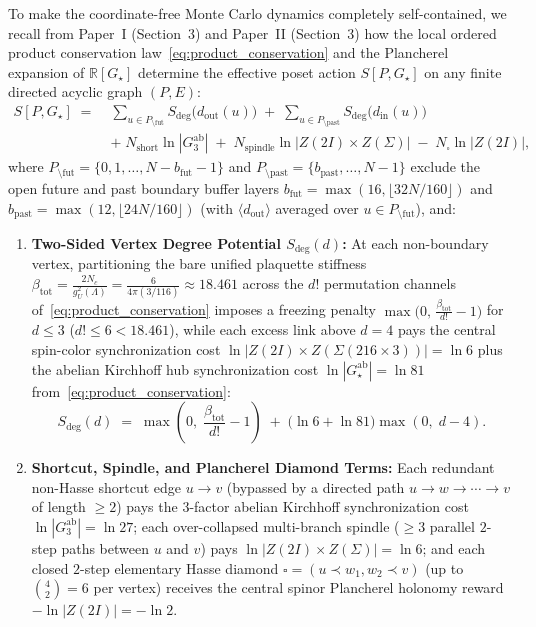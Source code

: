 \documentclass[11pt,a4paper]{article}
\theoremstyle{definition}
\theoremstyle{remark}
\newcommand{\R}{\mathbb{R}}
\newcommand{\Gthree}{G_3}
\newcommand{\Gstar}{G_\star}
\begin{document}
To make the coordinate-free Monte Carlo dynamics completely self-contained, we recall from Paper~I (Section~3) and Paper~II (Section~3) how the local ordered product conservation law~\eqref{eq:product_conservation} and the Plancherel expansion of $\R[\Gstar]$ determine the effective poset action $S[P, \Gstar]$ on any finite directed acyclic graph $(P, E)$:
\begin{equation}
\label{eq:poset_action_exp2}
\begin{aligned}
S[P, \Gstar] \;=\; &\sum_{u \in P_{\setminus\mathrm{fut}}} S_{\mathrm{deg}}\bigl(d_{\mathrm{out}}(u)\bigr) \;+\; \sum_{u \in P_{\setminus\mathrm{past}}} S_{\mathrm{deg}}\bigl(d_{\mathrm{in}}(u)\bigr) \\
&+\; N_{\mathrm{short}}\ln|\Gthree^{\mathrm{ab}}| \;+\; N_{\mathrm{spindle}}\ln|Z(2I)\times Z(\Sigma)| \;-\; N_\square \ln|Z(2I)|,
\end{aligned}
\end{equation}
where $P_{\setminus\mathrm{fut}} = \{0, 1, \dots, N - b_{\mathrm{fut}} - 1\}$ and $P_{\setminus\mathrm{past}} = \{b_{\mathrm{past}}, \dots, N - 1\}$ exclude the open future and past boundary buffer layers $b_{\mathrm{fut}} = \max(16, \lfloor 32N/160\rfloor)$ and $b_{\mathrm{past}} = \max(12, \lfloor 24N/160\rfloor)$ (with $\langle d_{\mathrm{out}}\rangle$ averaged over $u \in P_{\setminus\mathrm{fut}}$), and:
\begin{enumerate}
    \item \textbf{Two-Sided Vertex Degree Potential $S_{\mathrm{deg}}(d)$:} At each non-boundary vertex, partitioning the bare unified plaquette stiffness $\beta_{\mathrm{tot}} = \frac{2N_c}{g_U^2(\Lambda)} = \frac{6}{4\pi(3/116)} \approx 18.461$ across the $d!$ permutation channels of~\eqref{eq:product_conservation} imposes a freezing penalty $\max\bigl(0,\, \frac{\beta_{\mathrm{tot}}}{d!} - 1\bigr)$ for $d \le 3$ ($d! \le 6 < 18.461$), while each excess link above $d = 4$ pays the central spin-color synchronization cost $\ln|Z(2I)\times Z(\Sigma(216\times 3))| = \ln 6$ plus the abelian Kirchhoff hub synchronization cost $\ln|\Gstar^{\mathrm{ab}}| = \ln 81$ from~\eqref{eq:product_conservation}:
    \begin{equation}
    \label{eq:sdeg_def}
    S_{\mathrm{deg}}(d) \;=\; \max\!\left(0,\; \frac{\beta_{\mathrm{tot}}}{d!} - 1\right) \;+\; \bigl(\ln 6 + \ln 81\bigr)\max(0,\; d - 4).
    \end{equation}
    \item \textbf{Shortcut, Spindle, and Plancherel Diamond Terms:} Each redundant non-Hasse shortcut edge $u \to v$ (bypassed by a directed path $u \to w \to \cdots \to v$ of length $\ge 2$) pays the $3$-factor abelian Kirchhoff synchronization cost $\ln|\Gthree^{\mathrm{ab}}| = \ln 27$; each over-collapsed multi-branch spindle ($\ge 3$ parallel $2$-step paths between $u$ and $v$) pays $\ln|Z(2I)\times Z(\Sigma)| = \ln 6$; and each closed $2$-step elementary Hasse diamond $\square = (u \prec w_1, w_2 \prec v)$ (up to $\binom{4}{2} = 6$ per vertex) receives the central spinor Plancherel holonomy reward $-\ln|Z(2I)| = -\ln 2$.
\end{enumerate}
\end{document}
